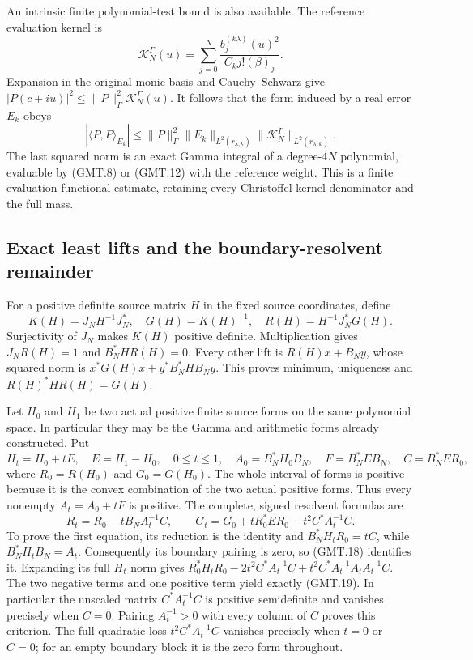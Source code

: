 An intrinsic finite polynomial-test bound is also available. The
reference evaluation kernel is
\[
 \mathcal K_N^\Gamma(u)=
       \sum_{j=0}^N\frac{b_j^{(k\lambda)}(u)^2}{C_kj!(\beta)_j}.
\]
Expansion in the original monic basis and Cauchy--Schwarz give
$|P(c+iu)|^2\le\|P\|_\Gamma^2\mathcal K_N^\Gamma(u)$.
It follows that the form induced by a real error $E_k$ obeys
\[
 |\langle P,P\rangle_{E_k}|
 \le\|P\|_\Gamma^2\|E_k\|_{L^2(r_{\lambda,k})}
       \|\mathcal K_N^\Gamma\|_{L^2(r_{\lambda,k})}.             \tag{GMT.17}
\]
The last squared norm is an exact Gamma integral of a degree-$4N$
polynomial, evaluable by (GMT.8) or (GMT.12) with the reference weight.
This is a finite evaluation-functional estimate, retaining every
Christoffel-kernel denominator and the full mass.

\subsection{Exact least lifts and the boundary-resolvent remainder}

For a positive definite source matrix $H$ in the fixed source coordinates,
define
\[
 K(H)=J_NH^{-1}J_N^*,\quad G(H)=K(H)^{-1},\quad
 R(H)=H^{-1}J_N^*G(H).                                         \tag{GMT.18}
\]
Surjectivity of $J_N$ makes $K(H)$ positive definite.
Multiplication gives $J_NR(H)=1$ and $B_N^*HR(H)=0$.
Every other lift is $R(H)x+B_Ny$, whose squared norm is
$x^*G(H)x+y^*B_N^*HB_Ny$. This proves minimum, uniqueness and
$R(H)^*HR(H)=G(H)$.

Let $H_0$ and $H_1$ be two actual positive finite source forms on
the same polynomial space. In particular they may be the Gamma and
arithmetic forms already constructed. Put
\[
 H_t=H_0+tE,\quad E=H_1-H_0,\quad0\le t\le1,\quad
 A_0=B_N^*H_0B_N,\quad F=B_N^*EB_N,\quad C=B_N^*ER_0,
\]
where $R_0=R(H_0)$ and $G_0=G(H_0)$. The whole interval of forms
is positive because it is the convex combination of the two actual
positive forms. Thus every nonempty $A_t=A_0+tF$ is positive.
The complete, signed resolvent formulas are
\[
 \boxed{R_t=R_0-tB_NA_t^{-1}C,\qquad
 G_t=G_0+tR_0^*ER_0-t^2C^*A_t^{-1}C.}                         \tag{GMT.19}
\]
To prove the first equation, its reduction is the identity and
$B_N^*H_tR_0=tC$, while $B_N^*H_tB_N=A_t$.
Consequently its boundary pairing is zero, so (GMT.18) identifies it.
Expanding its full $H_t$ norm gives
$R_0^*H_tR_0-2t^2C^*A_t^{-1}C+t^2C^*A_t^{-1}A_tA_t^{-1}C$.
The two negative terms and one positive term yield exactly (GMT.19).
In particular the unscaled matrix $C^*A_t^{-1}C$ is positive
semidefinite and vanishes precisely when $C=0$. Pairing $A_t^{-1}>0$
with every column of $C$ proves this criterion. The full quadratic
loss $t^2C^*A_t^{-1}C$ vanishes precisely when $t=0$ or $C=0$;
for an empty boundary block it is the zero form throughout.

